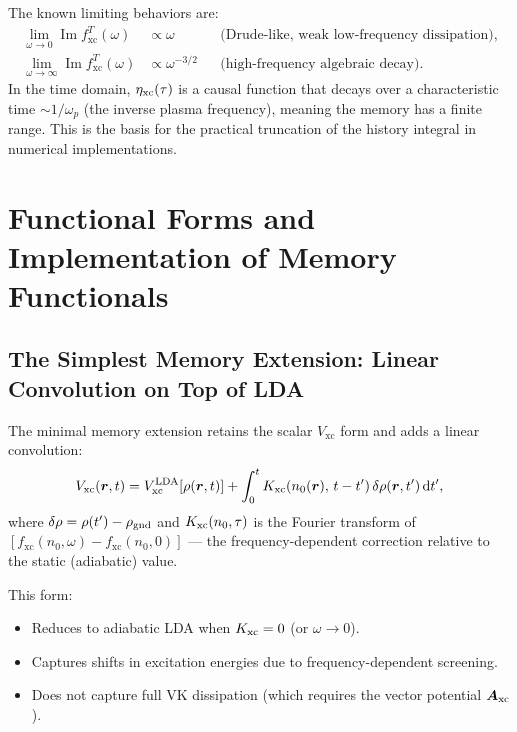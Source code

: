 \documentclass[12pt,letterpaper]{article}
\newcommand{\dd}{\mathrm{d}}
\newcommand{\Vxc}{V_{\mathrm{xc}}}
\newcommand{\fxc}{f_{\mathrm{xc}}}
\theoremstyle{definition}
\begin{document}
The known limiting behaviors are:
\begin{align}
  \lim_{\omega\to 0}\operatorname{Im}\fxc^T(\omega) &\propto \omega
  &&\text{(Drude-like, weak low-frequency dissipation)},\\
  \lim_{\omega\to\infty}\operatorname{Im}\fxc^T(\omega) &\propto \omega^{-3/2}
  &&\text{(high-frequency algebraic decay)}.
\end{align}
In the time domain, $\eta_{\rm xc}(\tau)$ is a causal function that
decays over a characteristic time $\sim 1/\omega_p$ (the inverse plasma
frequency), meaning the memory has a finite range.  This is the basis for
the practical truncation of the history integral in numerical implementations.

\section{Functional Forms and Implementation of Memory Functionals}
\label{sec:implementation}

\subsection{The Simplest Memory Extension: Linear Convolution on Top of LDA}

The minimal memory extension retains the scalar $\Vxc$ form and adds a
linear convolution:
\begin{equation}
  \Vxc(\bm{r},t) = \Vxc^{\rm LDA}[\rho(\bm{r},t)]
  + \int_0^t K_{\rm xc}(n_0(\bm{r}),\,t-t')\,\delta\rho(\bm{r},t')\,\dd t',
  \label{eq:memory_lda}
\end{equation}
where $\delta\rho = \rho(t') - \rho_{\rm gnd}$ and $K_{\rm xc}(n_0,\tau)$
is the Fourier transform of $[\fxc(n_0,\omega) - \fxc(n_0,0)]$ ---
the frequency-dependent correction relative to the static (adiabatic) value.

This form:
\begin{itemize}[noitemsep]
  \item Reduces to adiabatic LDA when $K_{\rm xc}=0$ (or $\omega\to 0$).
  \item Captures shifts in excitation energies due to frequency-dependent
    screening.
  \item Does not capture full VK dissipation (which requires the vector
    potential $\bm{A}_{\rm xc}$).
\end{itemize}
\end{document}
